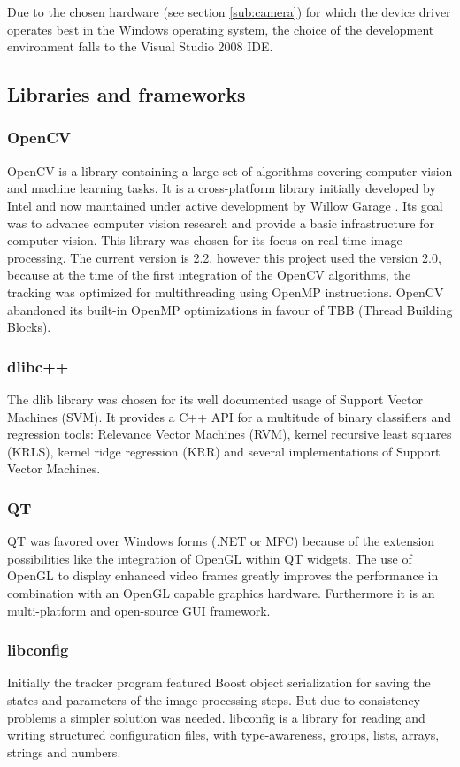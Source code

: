 Due to the chosen hardware (see section \ref{sub:camera}) for which the device driver operates best in the Windows operating system, the choice of the development environment falls to the Visual Studio 2008 IDE. 

\subsection{Libraries and frameworks}
\label{sub:libraries-and-frameworks}

\subsubsection{OpenCV}
OpenCV \cite{opencv} is a library containing a large set of algorithms covering computer vision and machine learning tasks. It is a cross-platform library initially developed by Intel and now maintained under active development by Willow Garage \cite{opencv-web}. Its goal was to advance computer vision research and provide a basic infrastructure for computer vision. This library was chosen for its focus on real-time image processing.
The current version is 2.2, however this project used the version 2.0, because at the time of the first integration of the OpenCV algorithms, the tracking was optimized for multithreading using OpenMP instructions. OpenCV abandoned its built-in OpenMP optimizations in favour of TBB (Thread Building Blocks).

\subsubsection{dlibc++}
The dlib library \cite{dlib} was chosen for its well documented usage of Support Vector Machines (SVM). It provides a C++ API for a multitude of binary classifiers and regression tools: Relevance Vector Machines (RVM), kernel recursive least squares (KRLS), kernel ridge regression (KRR) and several implementations of Support Vector Machines.

\subsubsection{QT}
QT \cite{qt} was favored over Windows forms (.NET or MFC) because of the extension possibilities like the integration of OpenGL within QT widgets. The use of OpenGL to display enhanced video frames greatly improves the performance in combination with an OpenGL capable graphics hardware. Furthermore it is an multi-platform and open-source GUI framework.

\subsubsection{libconfig}
Initially the tracker program featured Boost object serialization for saving the states and parameters of the image processing steps. But due to consistency problems a simpler solution was needed. libconfig is a library for reading and writing structured configuration files, with type-awareness, groups, lists, arrays, strings and numbers.

